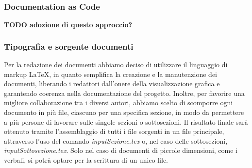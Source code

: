 \subsubsection{Documentation as Code}
\textbf{TODO adozione di questo approccio?}
\begin{comment}  
    L’approccio che si intende adottare è quello di "Documentation as Code" (Documentazione
    come Codice) che consiste nel trattare la documentazione di un progetto software allo
    stesso modo in cui si tratta il codice sorgente.
    Questo approccio è incentrato sull’utilizzo di pratiche e strumenti tipici dello sviluppo
    software per creare, gestire e distribuire la documentazione. Alcuni aspetti chiave della
    "Documentation as Code" includono:
        • Versionamento;
        • Scrittura in formato testuale;
        • Automazione;
        • Collaborazione;
        • Integrazione Continua;
        • Distribuzione.
    Questo approccio porta diversi vantaggi, tra cui una maggiore coerenza, una migliore
    tracciabilità delle modifiche e facilità di manutenzione. Inoltre, il concetto di "Documentation
    as Code" si allinea con la filosofia DevOps, dove la collaborazione e l’automazione sono valori
    chiave.
\end{comment}

\subsubsection{Tipografia e sorgente documenti}
Per la redazione dei documenti abbiamo deciso di utilizzare il linguaggio di markup \LaTeX{}, in quanto semplifica la creazione e la manutenzione
dei documenti, liberando i redattori dall'onere della visualizzazione grafica e garantendo coerenza nella documentazione del progetto.
Inoltre, per favorire una migliore collaborazione tra i diversi autori, abbiamo scelto di scomporre ogni documento in più file,
ciascuno per una specifica sezione, in modo da permettere a più persone di lavorare sulle singole sezioni o sottosezioni.
Il risultato finale sarà ottenuto tramite l'assemblaggio di tutti i file sorgenti in un file principale, attraverso l'uso del comando 
\textit{input{Sezione.tex}} o, nel caso delle sottosezioni, \textit{input{Sottosezione.tex}}.
Solo nel caso di documenti di piccole dimensioni, come i verbali, si potrà optare per la scrittura di un unico file. 


